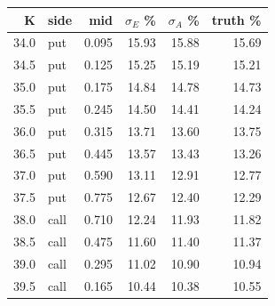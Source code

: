 \begin{center}\small
\begin{tabular}{|r|l|r|r|r|r|}
\hline
K & side & mid & $\sigma_E$ \% & $\sigma_A$ \% & truth \% \\ \hline
34.0 & put & 0.095 & 15.93 & 15.88 & 15.69 \\
34.5 & put & 0.125 & 15.25 & 15.19 & 15.21 \\
35.0 & put & 0.175 & 14.84 & 14.78 & 14.73 \\
35.5 & put & 0.245 & 14.50 & 14.41 & 14.24 \\
36.0 & put & 0.315 & 13.71 & 13.60 & 13.75 \\
36.5 & put & 0.445 & 13.57 & 13.43 & 13.26 \\
37.0 & put & 0.590 & 13.11 & 12.91 & 12.77 \\
37.5 & put & 0.775 & 12.67 & 12.40 & 12.29 \\
38.0 & call & 0.710 & 12.24 & 11.93 & 11.82 \\
38.5 & call & 0.475 & 11.60 & 11.40 & 11.37 \\
39.0 & call & 0.295 & 11.02 & 10.90 & 10.94 \\
39.5 & call & 0.165 & 10.44 & 10.38 & 10.55 \\
\hline
\end{tabular}
\end{center}

